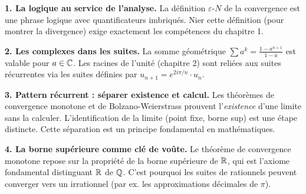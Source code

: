 \begin{intuitionbox}
\textbf{1. La logique au service de l'analyse.} La définition $\varepsilon$-$N$ de la convergence est une phrase logique avec quantificateurs imbriqués. Nier cette définition (pour montrer la divergence) exige exactement les compétences du chapitre 1.

\textbf{2. Les complexes dans les suites.} La somme géométrique $\sum a^k = \frac{1 - a^{n+1}}{1-a}$ est valable pour $a \in \mathbb{C}$. Les racines de l'unité (chapitre 2) sont reliées aux suites récurrentes via les suites définies par $u_{n+1} = e^{2i\pi/n} \cdot u_n$.

\textbf{3. Pattern récurrent : séparer existence et calcul.} Les théorèmes de convergence monotone et de Bolzano-Weierstrass prouvent l'\emph{existence} d'une limite sans la calculer. L'identification de la limite (point fixe, borne sup) est une étape distincte. Cette séparation est un principe fondamental en mathématiques.

\textbf{4. La borne supérieure comme clé de voûte.} Le théorème de convergence monotone repose sur la propriété de la borne supérieure de $\mathbb{R}$, qui est l'axiome fondamental distinguant $\mathbb{R}$ de $\mathbb{Q}$. C'est pourquoi les suites de rationnels peuvent converger vers un irrationnel (par ex. les approximations décimales de $\pi$).
\end{intuitionbox}



